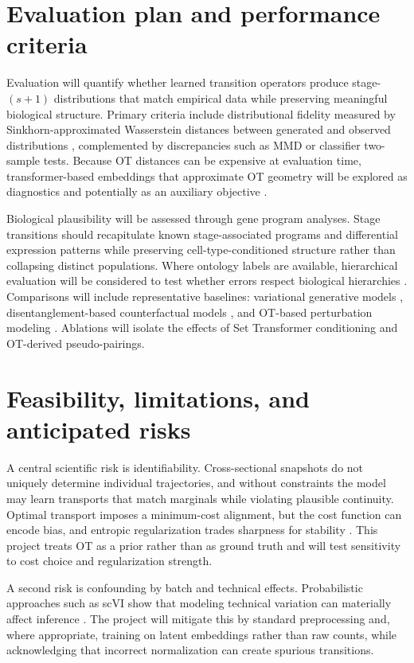\documentclass[conference]{IEEEtran}
\begin{document}
\section{Evaluation plan and performance criteria}

Evaluation will quantify whether learned transition operators produce stage-$(s+1)$ distributions that match empirical data while preserving meaningful biological structure. Primary criteria include distributional fidelity measured by Sinkhorn-approximated Wasserstein distances between generated and observed distributions \cite{Cuturi2013-li}, complemented by discrepancies such as MMD or classifier two-sample tests. Because OT distances can be expensive at evaluation time, transformer-based embeddings that approximate OT geometry will be explored as diagnostics and potentially as an auxiliary objective \cite{Haviv2024-uz}.

Biological plausibility will be assessed through gene program analyses. Stage transitions should recapitulate known stage-associated programs and differential expression patterns while preserving cell-type-conditioned structure rather than collapsing distinct populations. Where ontology labels are available, hierarchical evaluation will be considered to test whether errors respect biological hierarchies \cite{Cultrera-di-Montesano2026-vq}. Comparisons will include representative baselines: variational generative models \cite{Lopez2018-ns}, disentanglement-based counterfactual models \cite{Piran2024-ca}, and OT-based perturbation modeling \cite{Bunne2023-bm}. Ablations will isolate the effects of Set Transformer conditioning and OT-derived pseudo-pairings.

\section{Feasibility, limitations, and anticipated risks}

A central scientific risk is identifiability. Cross-sectional snapshots do not uniquely determine individual trajectories, and without constraints the model may learn transports that match marginals while violating plausible continuity. Optimal transport imposes a minimum-cost alignment, but the cost function can encode bias, and entropic regularization trades sharpness for stability \cite{Cuturi2013-li}. This project treats OT as a prior rather than as ground truth and will test sensitivity to cost choice and regularization strength.

A second risk is confounding by batch and technical effects. Probabilistic approaches such as scVI show that modeling technical variation can materially affect inference \cite{Lopez2018-ns}. The project will mitigate this by standard preprocessing and, where appropriate, training on latent embeddings rather than raw counts, while acknowledging that incorrect normalization can create spurious transitions.
\end{document}
